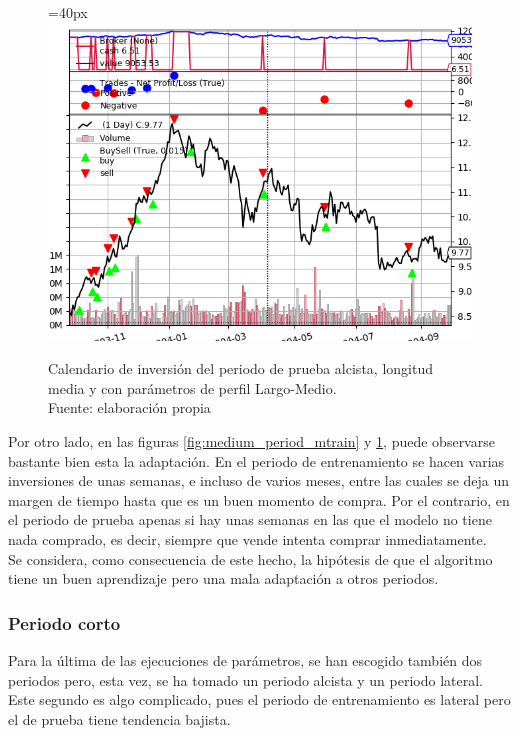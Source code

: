     	\begin{figure}[H]
     		\centering\leftskip=40px
     		\includegraphics[scale=0.66]{imagenes/M_Large-Medium_test.png}
     		\caption[Calendario de inversi\'on del periodo de prueba medio]{Calendario de inversi\'on del periodo de prueba alcista, longitud media y con par\'ametros de perfil Largo-Medio.\\ Fuente: elaboraci\'on propia}
     		\label{fig:medium_period_mtest}
     	\end{figure} 

Por otro lado, en las figuras \ref{fig:medium_period_mtrain} y \ref{fig:medium_period_mtest}, puede observarse bastante bien esta la adaptaci\'on. En el periodo de entrenamiento se hacen varias inversiones de unas semanas, e incluso de varios meses, entre las cuales se deja un margen de tiempo hasta que es un buen momento de compra. Por el contrario, en el periodo de prueba apenas si hay unas semanas en las que el modelo no tiene nada comprado, es decir, siempre que vende intenta comprar inmediatamente.\\

Se considera, como consecuencia de este hecho, la hip\'otesis de que el algoritmo tiene un buen aprendizaje pero una mala adaptaci\'on a otros periodos.\\

     	
\subsubsection{Periodo corto}

Para la \'ultima de las ejecuciones de par\'ametros, se han escogido tambi\'en dos periodos pero, esta vez, se ha tomado un periodo alcista y un periodo lateral. Este segundo es algo complicado, pues el periodo de entrenamiento es lateral pero el de prueba tiene tendencia bajista. \\

